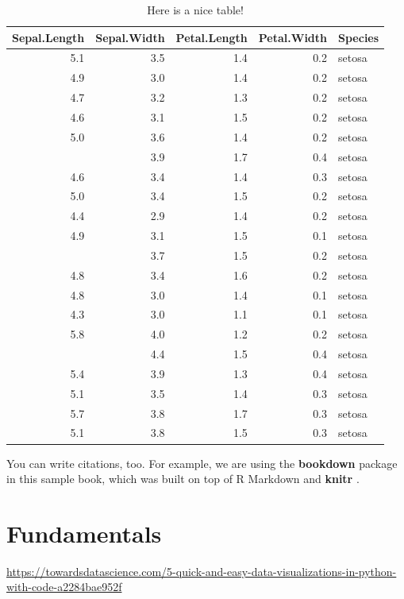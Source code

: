 \documentclass[]{book}
\theoremstyle{definition}
\theoremstyle{definition}
\theoremstyle{definition}
\theoremstyle{remark}
\begin{document}
\begin{table}

\caption{\label{tab:nice-tab}Here is a nice table!}
\centering
\begin{tabular}[t]{rrrrl}
\toprule
Sepal.Length & Sepal.Width & Petal.Length & Petal.Width & Species\\
\midrule
5.1 & 3.5 & 1.4 & 0.2 & setosa\\
4.9 & 3.0 & 1.4 & 0.2 & setosa\\
4.7 & 3.2 & 1.3 & 0.2 & setosa\\
4.6 & 3.1 & 1.5 & 0.2 & setosa\\
5.0 & 3.6 & 1.4 & 0.2 & setosa\\
\addlinespace
5.4 & 3.9 & 1.7 & 0.4 & setosa\\
4.6 & 3.4 & 1.4 & 0.3 & setosa\\
5.0 & 3.4 & 1.5 & 0.2 & setosa\\
4.4 & 2.9 & 1.4 & 0.2 & setosa\\
4.9 & 3.1 & 1.5 & 0.1 & setosa\\
\addlinespace
5.4 & 3.7 & 1.5 & 0.2 & setosa\\
4.8 & 3.4 & 1.6 & 0.2 & setosa\\
4.8 & 3.0 & 1.4 & 0.1 & setosa\\
4.3 & 3.0 & 1.1 & 0.1 & setosa\\
5.8 & 4.0 & 1.2 & 0.2 & setosa\\
\addlinespace
5.7 & 4.4 & 1.5 & 0.4 & setosa\\
5.4 & 3.9 & 1.3 & 0.4 & setosa\\
5.1 & 3.5 & 1.4 & 0.3 & setosa\\
5.7 & 3.8 & 1.7 & 0.3 & setosa\\
5.1 & 3.8 & 1.5 & 0.3 & setosa\\
\bottomrule
\end{tabular}
\end{table}

You can write citations, too. For example, we are using the
\textbf{bookdown} package \citep{R-bookdown} in this sample book, which
was built on top of R Markdown and \textbf{knitr} \citep{xie2015}.

\chapter{Fundamentals}\label{fundamentals}

\url{https://towardsdatascience.com/5-quick-and-easy-data-visualizations-in-python-with-code-a2284bae952f}
\end{document}

